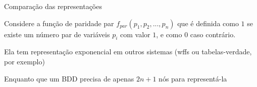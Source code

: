 \expandafter\documentclass\expandafter[table, usenames, svgnames, dvipsnames,14pt, \classopts]{beamer}
\begin{document}
\begin{frame}{Comparação das representações}

    \small
    Considere a função de paridade par $f_{par}(p_1, p_2, ..., p_n)$ que é definida como $1$ se existe um número par de variáveis $p_i$ com valor $1$, e como $0$ caso contrário.

    \begin{center}
    \end{center}    
    
    \begin{outline}
    
        \1 Ela tem representação exponencial em outros sistemas (wffs ou tabelas-verdade, por exemplo)
        
        \vspace{1em}
        
        \1 Enquanto que um BDD precisa de apenas $2n + 1$ nós para representá-la
    
    \end{outline}

\end{frame}
\end{document}
